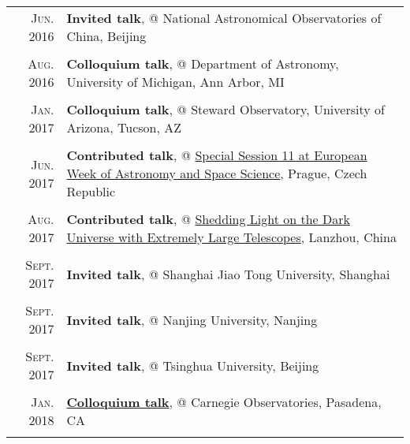 \documentclass[letterpaper,10pt]{article}
\begin{document}
\begin{longtable}{r|p{5.6in}}

    \textsc{Jun. 2016}   &   \textbf{Invited talk}, @ National Astronomical Observatories of China, Beijing   \\
    \multicolumn{2}{c}{} \\

    \textsc{Aug. 2016}   &   \textbf{Colloquium talk}, @ Department of Astronomy, University of Michigan, Ann Arbor, MI \\
    \multicolumn{2}{c}{} \\

    \textsc{Jan. 2017}   &   \textbf{Colloquium talk}, @ Steward Observatory, University of Arizona, Tucson, AZ \\
    \multicolumn{2}{c}{} \\

    \textsc{Jun. 2017}   &   \textbf{Contributed talk}, @
    \href{http://eas.unige.ch/EWASS2017/session.jsp?id=SS11}{Special Session 11 at
    European Week of Astronomy and Space Science}, Prague, Czech Republic   \\
    \multicolumn{2}{c}{} \\

    \textsc{Aug. 2017}   &   \textbf{Contributed talk}, @
    \href{http://darkuniverse2017.csp.escience.cn/dct/page/65580}{Shedding Light on
    the Dark Universe with Extremely Large Telescopes}, Lanzhou, China      \\
    \multicolumn{2}{c}{} \\

    \textsc{Sept. 2017}   &   \textbf{Invited talk}, @ Shanghai Jiao Tong University, Shanghai \\
    \multicolumn{2}{c}{} \\

    \textsc{Sept. 2017}   &   \textbf{Invited talk}, @ Nanjing University, Nanjing \\
    \multicolumn{2}{c}{} \\

    \textsc{Sept. 2017}   &   \textbf{Invited talk}, @ Tsinghua University, Beijing \\
    \multicolumn{2}{c}{} \\

    \textsc{Jan. 2018}   &   \href{http://obs.carnegiescience.edu/talk_event/828}{\textbf{Colloquium talk}}, @ Carnegie Observatories, Pasadena, CA \\
    \multicolumn{2}{c}{} \\


\end{longtable}
\end{document}
